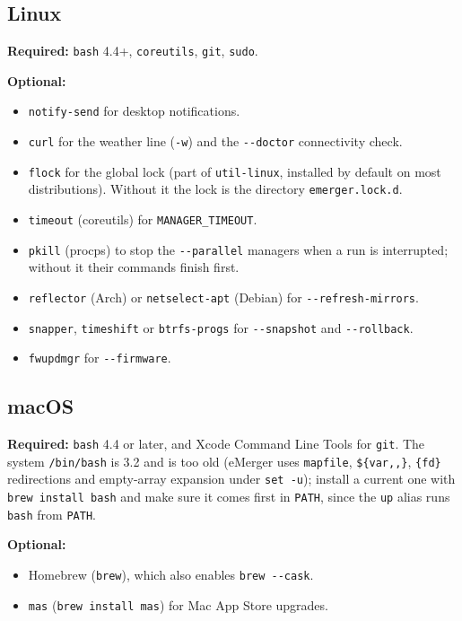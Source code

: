 \documentclass[11pt,a4paper]{article}
\begin{document}
\subsection{Linux}
\textbf{Required:} \texttt{bash} 4.4+, \texttt{coreutils}, \texttt{git},
\texttt{sudo}.

\textbf{Optional:}
\begin{itemize}
  \item \texttt{notify-send} for desktop notifications.
  \item \texttt{curl} for the weather line (\texttt{-w}) and the
        \texttt{-{}-doctor} connectivity check.
  \item \texttt{flock} for the global lock (part of \texttt{util-linux},
        installed by default on most distributions). Without it the lock
        is the directory \verb|emerger.lock.d|.
  \item \texttt{timeout} (coreutils) for \verb|MANAGER_TIMEOUT|.
  \item \texttt{pkill} (procps) to stop the \texttt{-{}-parallel} managers
        when a run is interrupted; without it their commands finish first.
  \item \texttt{reflector} (Arch) or \texttt{netselect-apt} (Debian)
        for \texttt{-{}-refresh-mirrors}.
  \item \texttt{snapper}, \texttt{timeshift} or \texttt{btrfs-progs} for
        \texttt{-{}-snapshot} and \texttt{-{}-rollback}.
  \item \texttt{fwupdmgr} for \texttt{-{}-firmware}.
\end{itemize}

\subsection{macOS}
\textbf{Required:} \texttt{bash} 4.4 or later, and Xcode Command Line
Tools for \texttt{git}. The system \texttt{/bin/bash} is 3.2 and is too
old (eMerger uses \texttt{mapfile}, \verb|${var,,}|, \verb|{fd}|
redirections and empty-array expansion under \texttt{set -u}); install a current one with \texttt{brew install bash} and
make sure it comes first in \texttt{PATH}, since the \texttt{up} alias
runs \texttt{bash} from \texttt{PATH}.

\textbf{Optional:}
\begin{itemize}
  \item Homebrew (\texttt{brew}), which also enables \texttt{brew -{}-cask}.
  \item \texttt{mas} (\texttt{brew install mas}) for Mac App Store
        upgrades.
\end{itemize}
\end{document}
